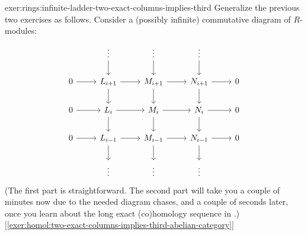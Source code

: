 \begin{exer}{\lnot}{exer:rings:infinite-ladder-two-exact-columns-implies-third}
  Generalize the previous two exercises as follows. Consider a
  (possibly infinite) commutative diagram of $R$-modules:
  \[\begin{tikzcd}
      & \vdots \ar[d] & \vdots \ar[d] & \vdots \ar[d] & \\
      0 \ar[r] & L_{i+1} \ar[r] \ar[d] & M_{i+1} \ar[r] \ar[d] & N_{i+1} \ar[r] \ar[d] & 0 \\
      0 \ar[r] & L_i \ar[r] \ar[d] & M_i \ar[r] \ar[d] & N_i \ar[r] \ar[d] & 0 \\
      0 \ar[r] & L_{i-1} \ar[r] \ar[d] & M_{i-1} \ar[r] \ar[d] & N_{i-1} \ar[r] \ar[d] & 0 \\
      & \vdots & \vdots & \vdots &
    \end{tikzcd}\]
   (The first part is straightforward. The second part will take
  you a couple of minutes now due to the needed diagram chases, and a
  couple of seconds later, once you learn about the long exact
  (co)homology sequence in
  .)
  [\ref{exer:homol:two-exact-columns-implies-third-abelian-category}]
\end{exer}


